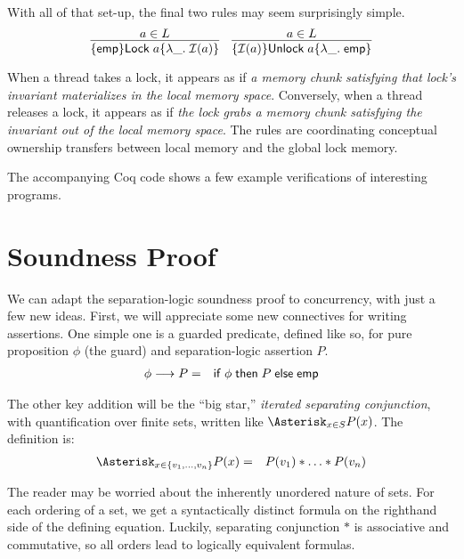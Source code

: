 \documentclass{amsbook}
\theoremstyle{definition}
\theoremstyle{remark}
\numberwithin{section}{chapter}
\numberwithin{equation}{chapter}
\begin{document}
With all of that set-up, the final two rules may seem surprisingly simple.
$$\infer{\hoare{\emp}{\mt{Lock} \; a}{\lambda \_. \; \mathcal I(a)}}{
  a \in L
}
\quad \infer{\hoare{\mathcal I(a)}{\mt{Unlock} \; a}{\lambda \_. \; \emp}}{
  a \in L
}$$

When a thread takes a lock, it appears as if \emph{a memory chunk satisfying that lock's invariant materializes in the local memory space}.
Conversely, when a thread releases a lock, it appears as if \emph{the lock grabs a memory chunk satisfying the invariant out of the local memory space}.
The rules are coordinating conceptual ownership transfers between local memory and the global lock memory.

The accompanying Coq code shows a few example verifications of interesting programs.

\section{Soundness Proof}

\newcommand{\guarded}[2]{#1 \longrightarrow #2}

We can adapt the separation-logic soundness proof to concurrency, with just a few new ideas.
First, we will appreciate some new connectives for writing assertions.
One simple one is a guarded predicate, defined like so, for pure proposition $\phi$ (the guard) and separation-logic assertion $P$.
\begin{eqnarray*}
  \guarded{\phi}{P} &=& \mt{if} \; \phi \; \mt{then} \; P \; \mt{else} \; \emp
\end{eqnarray*}

\renewcommand{\bigstar}[3]{\Asterisk_{#1 \in #2} #3}
\newcommand{\bigstarp}[3]{\Asterisk_{#1 \in #2} {\left ( #3 \right )}}

The other key addition will be the ``big star,'' \emph{iterated separating conjunction}, with quantification over finite sets, written like $\bigstar{x}{S}{P(x)}$.
The definition is:
\begin{eqnarray*}
  \bigstar{x}{\{v_1, \ldots, v_n\}}{P(x)} &=& P(v_1) * \ldots * P(v_n)
\end{eqnarray*}

The reader may be worried about the inherently unordered nature of sets.
For each ordering of a set, we get a syntactically distinct formula on the righthand side of the defining equation.
Luckily, separating conjunction $*$ is associative and commutative, so all orders lead to logically equivalent formulas.
\end{document}
